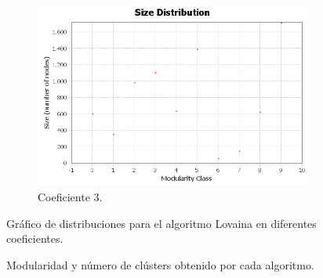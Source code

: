 \begin{figure}
  \hfill
  \begin{subfigure}[t]{0.48\textwidth}
    \centering
    \includegraphics[width=\textwidth]{img/resultados/lovaina3/communities-size-distribution.png}
    \caption{Coeficiente 3.}
  \end{subfigure}

  \caption{Gráfico de distribuciones para el algoritmo Lovaina en diferentes coeficientes.}
\end{figure}

\vspace{2\baselineskip}

\begin{figure}[H]
  \centering
  \caption{Modularidad y número de clústers obtenido por cada algoritmo.}
\end{figure}


